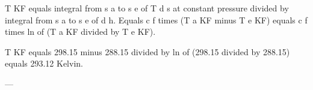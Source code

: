 T KF equals integral from s a to s e of T d s at constant pressure divided by integral from s a to s e of d h.  
Equals c f times (T a KF minus T e KF) equals c f times ln of (T a KF divided by T e KF).  

T KF equals 298.15 minus 288.15 divided by ln of (298.15 divided by 288.15) equals 293.12 Kelvin.  

---